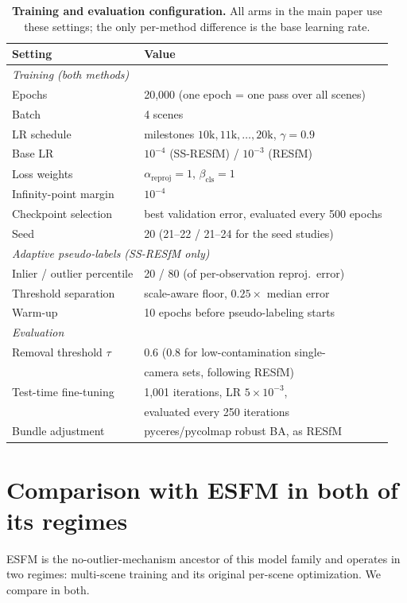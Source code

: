 \documentclass{article}
\begin{document}
\begin{table}[tb]\centering\footnotesize
\caption{\textbf{Training and evaluation configuration.} All arms in the main paper use
these settings; the only per-method difference is the base learning rate.}
\label{tab:supp_config}
\setlength{\tabcolsep}{4pt}%
\begin{tabular}{ll}
\toprule
Setting & Value\\
\midrule
\multicolumn{2}{l}{\emph{Training (both methods)}}\\
Epochs & 20{,}000 (one epoch = one pass over all scenes)\\
Batch & 4 scenes\\
LR schedule & milestones $10\text{k},11\text{k},\ldots,20\text{k}$, $\gamma=0.9$\\
Base LR & $10^{-4}$ (SS-RESfM) / $10^{-3}$ (RESfM)\\
Loss weights & $\alpha_{\text{reproj}}=1$, $\beta_{\text{cls}}=1$\\
Infinity-point margin & $10^{-4}$\\
Checkpoint selection & best validation error, evaluated every 500 epochs\\
Seed & 20 (21--22 / 21--24 for the seed studies)\\
\midrule
\multicolumn{2}{l}{\emph{Adaptive pseudo-labels (SS-RESfM only)}}\\
Inlier / outlier percentile & 20 / 80 (of per-observation reproj.\ error)\\
Threshold separation & scale-aware floor, $0.25\times$ median error\\
Warm-up & 10 epochs before pseudo-labeling starts\\
\midrule
\multicolumn{2}{l}{\emph{Evaluation}}\\
Removal threshold $\tau$ & 0.6 (0.8 for low-contamination single-\\
 & camera sets, following RESfM)\\
Test-time fine-tuning & 1{,}001 iterations, LR $5\times10^{-3}$,\\
 & evaluated every 250 iterations\\
Bundle adjustment & pyceres/pycolmap robust BA, as RESfM\\
\bottomrule
\end{tabular}
\end{table}

\section{Comparison with ESFM in both of its regimes}\label{app:esfmboth}
ESFM is the no-outlier-mechanism ancestor of this model family and operates in two
regimes: multi-scene training and its original per-scene optimization. We compare in
both.
\end{document}
